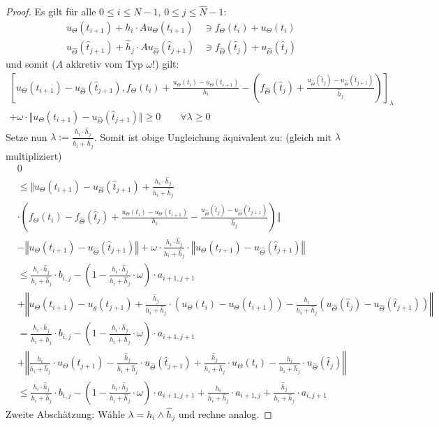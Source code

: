 \begin{proof}
Es gilt für alle $0\leq i\leq N-1$, $0\leq j\leq\hat{N}-1$:
\begin{align*}
u_\Theta(t_{i+1})+h_i\cdot Au_\Theta(t_{i+1})&\ni f_\Theta(t_i)+u_\Theta(t_i)\\
u_{\hat{\Theta}}(\hat{t}_{j+1})+\hat{h}_j\cdot Au_{\hat{\Theta}}(\hat{t}_{j+1})&\ni f_{\hat{\Theta}}(\hat{t}_j)+u_{\hat{\Theta}}(\hat{t}_{j})
\end{align*}
und somit ($A$ akkretiv vom Typ $\omega$!) gilt:
\begin{align*}
\left[u_\Theta(t_{i+1})-u_{\hat{\Theta}}(\hat{t}_{j+1}),f_\Theta(t_i)+\frac{u_\Theta(t_i)-u_\Theta(t_{i+1})}{h_i}-\left(f_{\hat{\Theta}}(\hat{t}_j)+\frac{u_{\hat{\Theta}}(\hat{t}_j)-u_{\hat{\Theta}}(\hat{t}_{j+1})}{\hat{h}_j}\right)\right]_\lambda\\
+\omega\cdot\Big\Vert u_\Theta(t_{i+1})-u_{\hat{\Theta}}(\hat{t}_{j+1})\Big\Vert\geq0\qquad\forall\lambda\geq0
\end{align*}
Setze nun $\lambda:=\frac{h_i\cdot\hat{h}_j}{h_i+\hat{h}_j}$. Somit ist obige Ungleichung äquivalent zu: (gleich mit $\lambda$ multipliziert)
\begin{align*}
&0\\
&\leq
\Bigg\Vert u_\Theta(t_{i+1})-u_{\hat{\Theta}}(\hat{t}_{j+1})+\frac{h_i\cdot\hat{h}_j}{h_i+\hat{h}_j}\\
&\cdot\left(f_\Theta(t_i)-f_{\hat{\Theta}}(\hat{t}_j)+\frac{u_\Theta(t_i)-u_\Theta(t_{i+1})}{h_i}-\frac{u_{\hat{\Theta}}(\hat{t}_j)-u_{\hat{\Theta}}(\hat{t}_{j+1})}{\hat{h}_j}\right)\Bigg\Vert\\
&-\left\Vert u_\Theta(t_{i+1})-u_{\hat{\Theta}}(\hat{t}_{j+1})\right\Vert
+\omega\cdot\frac{h_i\cdot\hat{h}_j}{h_i+\hat{h}_j}\cdot\left\Vert u_\Theta(t_{i+1})-u_{\hat{\Theta}}(\hat{t}_{j+1})\right\Vert\\
&\leq
\frac{h_i\cdot\hat{h}_j}{h_i+\hat{h}_j}\cdot b_{i,j}-\left(1-\frac{h_i\cdot\hat{h}_j}{h_i+\hat{h}_j}\cdot\omega\right)\cdot a_{i+1,j+1}\\
&+\left\Vert u_\Theta(t_{i+1})-u_{\hat{\theta}}(t_{j+1})+\frac{\hat{h}_j}{h_i+\hat{h}_j}\cdot\left(u_\Theta(t_i)-u_\Theta(t_{i+1})\right)-\frac{h_i}{h_i+\hat{h}_j} %
\left(u_{\hat{\Theta}}(\hat{t}_j)-u_{\hat{\Theta}}(\hat{t}_{j+1})\right)\right\Vert\\
&=\frac{h_i\cdot\hat{h}_j}{h_i+\hat{h}_j}\cdot b_{i,j}-\left(1-\frac{h_i\cdot\hat{h}_j}{h_i+\hat{h}_j}\cdot\omega\right)\cdot a_{i+1,j+1}\\
&+\left\Vert\frac{h_i}{h_i+\hat{h}_j}\cdot u_\Theta(t_{j+1})-\frac{\hat{h}_j}{h_i+\hat{h}_j}\cdot u_{\hat{\Theta}}(\hat{t}_{j+1})+\frac{\hat{h}_j}{h_i+\hat{h}_j}\cdot u_\Theta(t_i)-\frac{h_i}{h_i+\hat{h}_j}\cdot u_{\hat{\Theta}}(\hat{t}_j)\right\Vert\\
&\leq
\frac{h_i\cdot\hat{h}_j}{h_i+\hat{h}_j}\cdot b_{i,j}-\left(1-\frac{h_i\cdot\hat{h}_j}{h_i+\hat{h}_j}\cdot\omega\right)\cdot a_{i+1,j+1}
+\frac{h_i}{h_i+\hat{h}_j}\cdot a_{i+1,j}+\frac{\hat{h}_j}{h_i+\hat{h}_j}\cdot a_{i,j+1}
\end{align*}
Zweite Abschätzung: Wähle $\lambda=h_i\wedge\hat{h}_j$ und rechne analog.
\end{proof}

